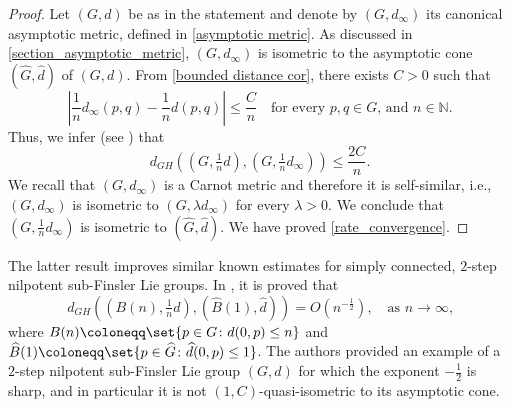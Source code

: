 \documentclass[a4paper,11pt,reqno]{amsart}
\theoremstyle{plain}
\theoremstyle{definition}
\newtheorem{example}[theorem]{Example}
\newcommand{\N}{\mathbb N}
\renewcommand{\H}{\mathbb H}
\newcommand{\g}{\mathfrak{g}}
\newcommand{\coloneq}{\coloneqq}
\begin{document}
\begin{proof}
 Let $(G,d)$ be as in the statement and denote by $(G,d_\infty)$ its canonical asymptotic metric, defined in \eqref{asymptotic metric}. As discussed in \cref{section_asymptotic_metric}, $(G,d_\infty)$ is isometric to the asymptotic cone $(\widehat{G},\widehat{d})$ of $(G,d)$. From \cref{bounded distance cor}, there exists $C>0$ such that
\begin{equation*}
 \left\lvert \frac{1}{n}d_\infty(p,q) - \frac{1}{n}d(p,q) \right\rvert \le \frac{C}{n} \quad \text{for every $p,q \in G$, and $n \in \N$.}
\end{equation*}
Thus, we infer (see \cite[Corollary 7.3.28]{MR1835418}) that
\begin{equation} \label{gh_inequality1}
 d_{GH}\left((G,\tfrac{1}{n}d),(G,\tfrac{1}{n}d_\infty)\right) \le \frac{2C}{n}.
 \end{equation}
We recall that $(G,d_\infty)$ is a Carnot metric and therefore it is self-similar, i.e., $(G,d_\infty)$ is isometric to $(G,\lambda d_\infty)$ for every $\lambda > 0$. We conclude that $(G,\tfrac{1}{n}d_\infty)$ is isometric to $(\widehat{G},\widehat{d})$. We have proved \eqref{rate_convergence}. 
\end{proof}

The latter result improves similar known estimates for simply connected, $2$-step nilpotent sub-Finsler Lie groups. In \cite{MR3153949}, it is proved that
\begin{equation*}
 d_{GH}\left((B(n),\tfrac{1}{n}d),(\widehat{B}(1),\widehat{d})\right) = O(n^{-\frac{1}{2}}), \quad \text{as $n \to\infty$,} 
 \end{equation*}
 where $B(n) \coloneq \set{p \in G \colon d(0,p) \le n}$ and $\widehat{B}(1) \coloneq \set{p \in \widehat{G} \colon \widehat{d}(0,p) \le 1}$. The authors provided an example of a $2$-step nilpotent sub-Finsler Lie group $(G,d)$ for which the exponent $-\tfrac{1}{2}$ is sharp, and in particular it is not $(1,C)$-quasi-isometric to its asymptotic cone. 
 


\end{document}
